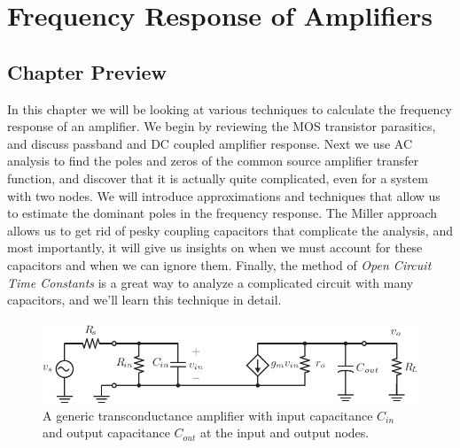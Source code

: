 \chapter{Frequency Response of Amplifiers}
\label{ch:ch14_freq_resp}
\graphicspath{{./figs_freq_resp/}}
\section{Chapter Preview}
In this chapter we will be looking at various techniques to calculate the frequency response of an amplifier.  We begin by reviewing the MOS transistor parasitics, and discuss passband and DC coupled amplifier response.  Next we use AC analysis to find the poles and zeros of the common source amplifier transfer function, and discover that it is actually quite complicated, even for a system with two nodes.  We will introduce approximations and techniques that allow us to estimate the dominant poles in the frequency response.  The Miller approach allows us to get rid of pesky coupling capacitors that complicate the analysis, and most importantly, it will give us insights on when we must account for these capacitors and when we can ignore them.  Finally, the method of \emph{Open Circuit Time Constants} is a great way to analyze a complicated circuit with many capacitors, and we'll learn this technique in detail.
\newpage
\begin{figure}[t]
\centering
\includegraphics[scale=1.25]{amp_two_poles}
\caption{A generic transconductance amplifier with input capacitance $C_{in}$ and output capacitance $C_{out}$ at the input and output nodes.}
\label{fig:amp_two_poles_indep}
\end{figure}
